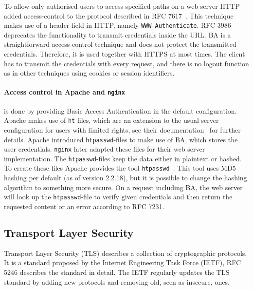 To allow only authorised users to access specified paths on a web server HTTP
added access-control to the protocol described in RFC 7617~\cite{rfc7617}. This
technique makes use of a header field in HTTP, namely \texttt{WWW-Authenticate}.
RFC 3986~\cite{rfc3986} deprecates the functionality to transmit credentials
inside the URL. BA is a straightforward access-control technique and does not
protect the transmitted credentials. Therefore, it is used together with HTTPS
at most times. The client has to transmit the credentials with every request,
and there is no logout function as in other techniques using cookies or session
identifiers.

\paragraph{Access control in Apache and \texttt{nginx}} is done by providing
Basic Access Authentication in the default configuration. Apache makes use of
\texttt{ht} files, which are an extension to the usual server configuration for
users with limited rights, see their documentation~\cite{apacheauthdoc} for
further details. Apache introduced \texttt{htpasswd}-files to make use of BA,
which stores the user credentials. \texttt{nginx} later adapted these files for
their web server implementation. The \texttt{htpasswd}-files keep the data
either in plaintext or hashed. To create these files Apache provides the tool
\texttt{htpasswd}~\cite{htpasswddoc}. This tool uses MD5 hashing per default (as
of version 2.2.18), but it is possible to change the hashing algorithm to
something more secure. On a request including BA, the web server will look up
the \texttt{htpasswd}-file to verify given credentials and then return the
requested content or an error according to RFC 7231\cite{rfc7231}.

\subsection{Transport Layer Security}

Transport Layer Security (TLS) describes a collection of cryptographic
protocols. It is a standard proposed by the Internet Engineering Task Force
(IETF), RFC 5246\cite{rfc5246} describes the standard in detail. The IETF
regularly updates the TLS standard by adding new protocols and removing old,
seen as insecure, ones.


